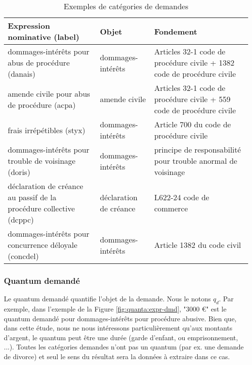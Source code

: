 \begin{table}[h!]
\scriptsize
\begin{tabular}{|p{}|p{}|p{}|}
\hline
\textbf{Expression nominative (label)  }                                     & \textbf{Objet}                                                       & \textbf{Fondement}                                                                 \\ \hline
dommages-intérêts pour abus de procédure (danais)                    & dommages-intérêts                                           & Articles 32-1 code de procédure civile + 1382 code de procédure civile \\ \hline
amende civile pour abus de procédure (acpa)                        & amende civile                                               & Articles 32-1 code de procédure civile + 559 code de procédure civile  \\ \hline
frais irrépétibles  (styx)                                        & dommages-intérêts                                           & Article 700 du code de procédure civile                                 \\ \hline
dommages-intérêts pour trouble de voisinage (doris)                 & dommages-intérêts                                           & principe de responsabilité pour trouble anormal de voisinage           \\ \hline
déclaration de créance au passif de la procédure collective (dcppc) & déclaration de créance & L622-24 code de commerce                                               \\ \hline
dommages-intérêts pour concurrence déloyale (concdel)                  & dommages-intérêts                                           & Article 1382 du code civil                                             \\ \hline
\end{tabular}
\caption{Exemples de catégories de demandes}\label{tab:quanta:exemple-categorie}
\end{table}

\subsubsection{Quantum demandé}
Le quantum demandé quantifie l'objet de la demande. Nous le notons $q_d$. Par exemple, dans l'exemple de la Figure \ref{fig:quanta:expr-dmd}, "3000 \euro{}" est le quantum demandé pour dommages-intérêts pour procédure abusive. Bien que, dans cette étude, nous ne nous intéressons particulièrement qu'aux montants d'argent, le quantum peut être une durée (garde d'enfant, ou emprisonnement, ...). Toutes les catégories demandes n'ont pas un quantum (par ex. une demande de divorce) et seul le sens du résultat sera la données à extraire dans ce cas.


